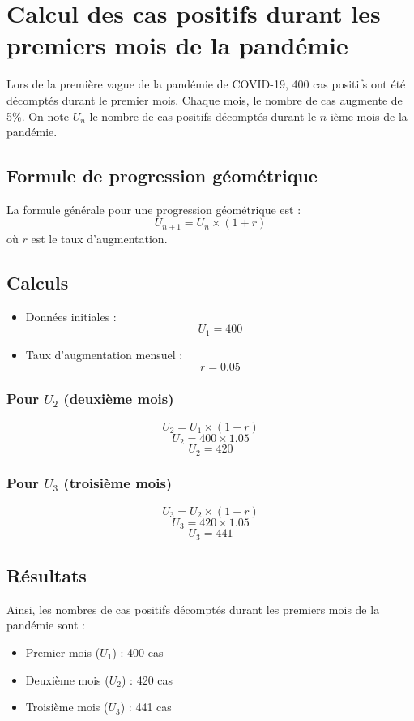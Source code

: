\documentclass{article}
\begin{document}
\section*{Calcul des cas positifs durant les premiers mois de la pandémie}

Lors de la première vague de la pandémie de COVID-19, 400 cas positifs ont été décomptés durant le premier mois. Chaque mois, le nombre de cas augmente de 5\%. On note \( U_{n} \) le nombre de cas positifs décomptés durant le \( n \)-ième mois de la pandémie.

\subsection*{Formule de progression géométrique}
La formule générale pour une progression géométrique est :
\[
U_{n+1} = U_n \times (1 + r)
\]
où \( r \) est le taux d'augmentation.

\subsection*{Calculs}
\begin{itemize}
    \item Données initiales :
    \[
    U_1 = 400
    \]
    \item Taux d'augmentation mensuel :
    \[
    r = 0.05
    \]
\end{itemize}

\subsubsection*{Pour \( U_2 \) (deuxième mois)}
\[
U_2 = U_1 \times (1 + r)
\]
\[
U_2 = 400 \times 1.05
\]
\[
U_2 = 420
\]

\subsubsection*{Pour \( U_3 \) (troisième mois)}
\[
U_3 = U_2 \times (1 + r)
\]
\[
U_3 = 420 \times 1.05
\]
\[
U_3 = 441
\]

\subsection*{Résultats}
Ainsi, les nombres de cas positifs décomptés durant les premiers mois de la pandémie sont :
\begin{itemize}
    \item Premier mois (\( U_1 \)) : 400 cas
    \item Deuxième mois (\( U_2 \)) : 420 cas
    \item Troisième mois (\( U_3 \)) : 441 cas
\end{itemize}
\end{document}
